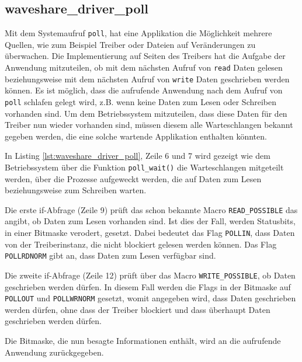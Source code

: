\subsection{waveshare\_driver\_poll}  %
Mit dem Systemaufruf \texttt{poll}, hat eine Applikation die Möglichkeit mehrere Quellen, wie zum Beispiel Treiber oder Dateien auf Veränderungen zu überwachen. Die Implementierung auf Seiten des Treibers hat die Aufgabe der Anwendung mitzuteilen, ob mit dem nächsten Aufruf von \texttt{read} Daten gelesen beziehungsweise mit dem nächsten Aufruf von \texttt{write} Daten geschrieben werden können. Es ist möglich, dass die aufrufende Anwendung nach dem Aufruf von \texttt{poll} schlafen gelegt wird, z.B. wenn keine Daten zum Lesen oder Schreiben vorhanden sind. Um dem Betriebssystem mitzuteilen, dass diese Daten für den Treiber nun wieder vorhanden sind, müssen diesem alle Warteschlangen bekannt gegeben werden, die eine solche wartende Applikation enthalten könnten.

In Listing \ref{lst:waveshare_driver_poll}, Zeile 6 und 7 wird gezeigt wie dem Betriebssystem über die Funktion \texttt{poll\_wait()} die Warteschlangen mitgeteilt werden, über die Prozesse aufgeweckt werden, die auf Daten zum Lesen beziehungsweise zum Schreiben warten. 

Die erste if-Abfrage (Zeile 9) prüft das schon bekannte Macro \texttt{READ\_POSSIBLE} das angibt, ob Daten zum Lesen vorhanden sind. Ist dies der Fall, werden Statusbits, in einer Bitmaske verodert, gesetzt. Dabei bedeutet das Flag \texttt{POLLIN}, dass Daten von der Treiberinstanz, die nicht blockiert gelesen werden können. Das Flag \texttt{POLLRDNORM} gibt an, dass Daten zum Lesen verfügbar sind.

Die zweite if-Abfrage (Zeile 12) prüft über das Macro \texttt{WRITE\_POSSIBLE}, ob Daten geschrieben werden dürfen. In diesem Fall werden die Flags in der Bitmaske auf \texttt{POLLOUT} und \texttt{POLLWRNORM} gesetzt, womit angegeben wird, dass Daten geschrieben werden dürfen, ohne dass der Treiber blockiert und dass überhaupt Daten geschrieben werden dürfen. 

Die Bitmaske, die nun besagte Informationen enthält, wird an die aufrufende Anwendung zurückgegeben. 




